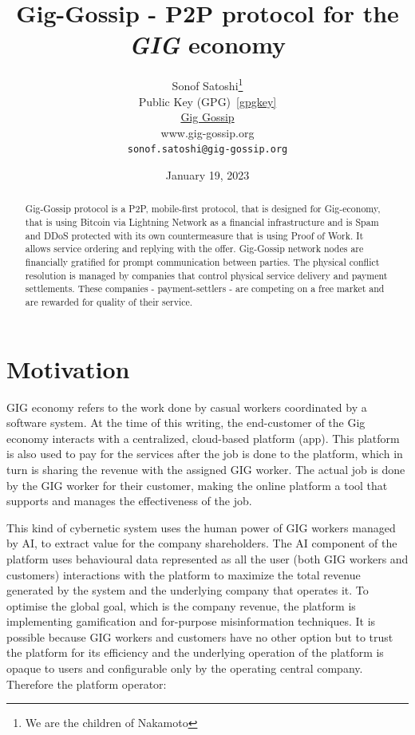 \documentclass{article}
\title{Gig-Gossip - P2P protocol for the \emph{GIG} economy}
\date{January 19, 2023}
\author{
	{Sonof Satoshi}\thanks{We are the children of Nakamoto} \\
	Public Key (GPG)~\ref{gpgkey} \\
	\href{www.gig-gossip.org}{Gig Gossip}\\
	www.gig-gossip.org \\
	\texttt{sonof.satoshi@gig-gossip.org}\\
}
\begin{document}
\maketitle

\begin{abstract}
Gig-Gossip protocol is a P2P, mobile-first protocol, that is designed for Gig-economy, that is using Bitcoin via Lightning Network as a financial infrastructure and is Spam and DDoS protected with its own countermeasure that is using Proof of Work. It allows service ordering and replying with the offer. Gig-Gossip network nodes are financially gratified for prompt communication between parties. The physical conflict resolution is managed by companies that control physical service delivery and payment settlements. These companies - payment-settlers - are competing on a free market and are rewarded for quality of their service.
\end{abstract}



\section{Motivation}
GIG economy refers to the work done by casual workers coordinated by a software system. At the time of this writing, the end-customer of the Gig economy interacts with a centralized, cloud-based platform (app). This platform is also used to pay for the services after the job is done to the platform, which in turn is sharing the revenue with the assigned GIG worker. The actual job is done by the GIG worker for their customer, making the online platform a tool that supports and manages the effectiveness of the job.

This kind of cybernetic system uses the human power of GIG workers managed by AI, to extract value for the company shareholders. The AI component of the platform uses behavioural data represented as all the user (both GIG workers and customers) interactions with the platform to maximize the total revenue generated by the system and the underlying company that operates it. To optimise the global goal, which is the company revenue, the platform is implementing gamification and for-purpose misinformation techniques. It is possible because GIG workers and customers have no other option but to trust the platform for its efficiency and the underlying operation of the platform is opaque to users and configurable only by the operating central company. Therefore the platform operator:
\end{document}
